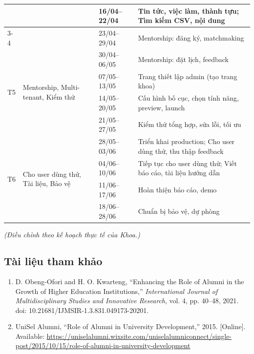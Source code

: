 \documentclass[12pt,a4paper]{article}
\begin{document}
\begin{longtable}{|p{1.5cm}|p{5cm}|p{3cm}|p{6cm}|}
& & 16/04--22/04 &
Tin tức, việc làm, thành tựu; Tìm kiếm CSV, nội dung \\
\cline{3-4}

& & 23/04--29/04 &
Mentorship: đăng ký, matchmaking \\
\hline

\multirow{4}{*}{T5} &
\multirow{4}{=}{Mentorship, Multi-tenant, Kiểm thử} &
30/04--06/05 &
Mentorship: đặt lịch, feedback \\
\cline{3-4}

& & 07/05--13/05 &
Trang thiết lập admin (tạo trang khoa) \\
\cline{3-4}

& & 14/05--20/05 &
Cấu hình bố cục, chọn tính năng, preview, launch \\
\cline{3-4}

& & 21/05--27/05 &
Kiểm thử tổng hợp, sửa lỗi, tối ưu \\
\hline

\multirow{4}{*}{T6} &
\multirow{4}{=}{Cho user dùng thử, Tài liệu, Bảo vệ} &
28/05--03/06 &
Triển khai production; Cho user dùng thử, thu thập feedback \\
\cline{3-4}

& & 04/06--10/06 &
Tiếp tục cho user dùng thử; Viết báo cáo, tài liệu hướng dẫn \\
\cline{3-4}

& & 11/06--17/06 &
Hoàn thiện báo cáo, demo \\
\cline{3-4}

& & 18/06--28/06 &
Chuẩn bị bảo vệ, dự phòng \\
\hline
\end{longtable}

\vspace{0.5em}
\noindent\textit{(Điều chỉnh theo kế hoạch thực tế của Khoa.)}
\newpage

\subsection{Tài liệu tham khảo}

\begin{enumerate}
\item D. Obeng-Ofori and H. O. Kwarteng, ``Enhancing the Role of Alumni in the Growth of Higher Education Institutions,'' \textit{International Journal of Multidisciplinary Studies and Innovative Research}, vol. 4, pp. 40--48, 2021. doi: 10.21681/IJMSIR-1.3.831.049173-20201.

\item UniSel Alumni, ``Role of Alumni in University Development,'' 2015. 
[Online]. Available: 
\url{https://uniselalumni.wixsite.com/uniselalumniconnect/single-post/2015/10/15/role-of-alumni-in-university-development}
\end{enumerate}
\end{document}
